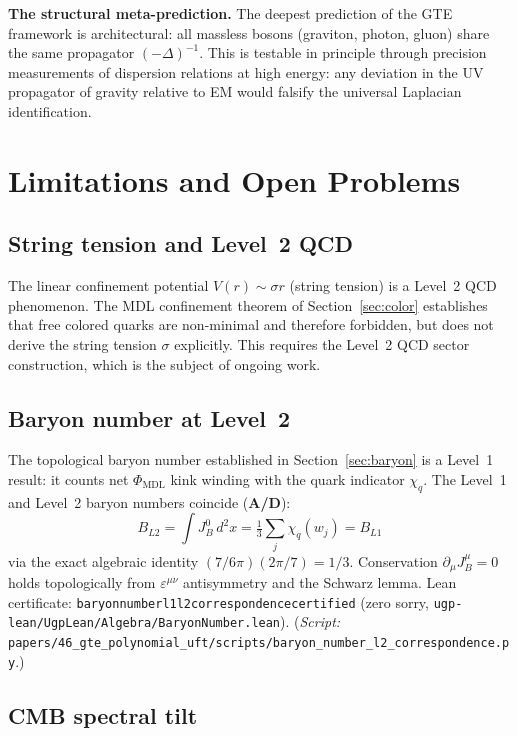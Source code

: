 \documentclass[11pt]{article}
\theoremstyle{remark}
\newcommand{\PHIMDL}{\Phi_{\mathrm{MDL}}}
\newcommand{\lean}[1]{%
  \penalty-100
  \begingroup\def\_{\textunderscore\allowbreak}\texttt{#1}\endgroup}
\newcommand{\CatAD}{\textbf{A/D}}
\begin{document}
\medskip
\noindent\textbf{The structural meta-prediction.}
The deepest prediction of the GTE framework is architectural: all massless
bosons (graviton, photon, gluon) share the same propagator $(-\Delta)^{-1}$.
This is testable in principle through precision measurements of dispersion
relations at high energy: any deviation in the UV propagator of gravity relative
to EM would falsify the universal Laplacian identification.

\section{Limitations and Open Problems}
\label{sec:open}

\subsection{String tension and Level~2 QCD}
\label{ssec:string_tension}

The linear confinement potential $V(r)\sim\sigma r$ (string tension) is a Level~2
QCD phenomenon. The MDL confinement theorem of Section~\ref{sec:color} establishes
that free colored quarks are non-minimal and therefore forbidden, but does not
derive the string tension $\sigma$ explicitly. This requires the Level~2 QCD
sector construction, which is the subject of ongoing work.

\subsection{Baryon number at Level~2}
\label{ssec:baryon_level2}

The topological baryon number established in Section~\ref{sec:baryon} is a
Level~1 result: it counts net $\PHIMDL$ kink winding with the quark indicator
$\chi_q$.  The Level~1 and Level~2 baryon numbers coincide (\CatAD):
\[
  B_{L2} = \int J^0_B\,d^2x = \tfrac{1}{3}\sum_j\chi_q(w_j) = B_{L1}
\]
via the exact algebraic identity $(7/6\pi)(2\pi/7) = 1/3$.
Conservation $\partial_\mu J^\mu_B = 0$ holds topologically from
$\varepsilon^{\mu\nu}$ antisymmetry and the Schwarz lemma.
Lean certificate: \lean{baryon\_number\_l1\_l2\_correspondence\_certified}
(zero sorry, \texttt{ugp-lean/UgpLean/Algebra/BaryonNumber.lean}).
(\textit{Script:} \texttt{papers/46\_gte\_polynomial\_uft/scripts/baryon\_number\_l2\_correspondence.py}.)

\subsection{CMB spectral tilt}
\label{ssec:ns}
\end{document}

